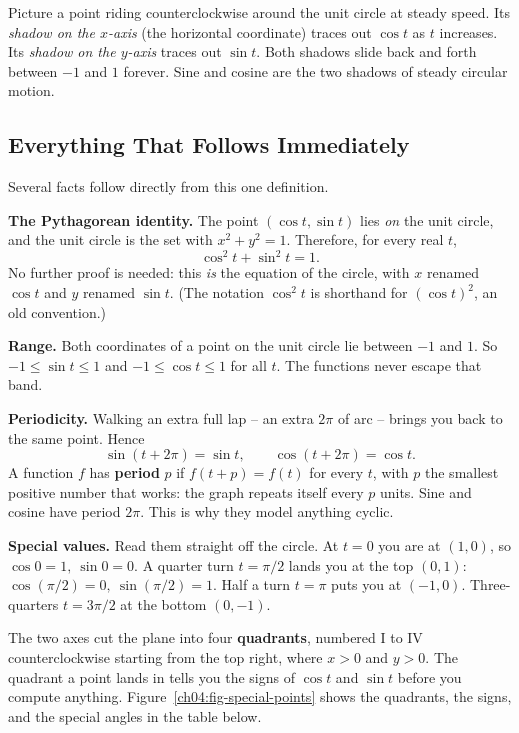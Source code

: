 \begin{intuitionbox}
Picture a point riding counterclockwise around the unit circle at steady speed. Its \emph{shadow on the $x$-axis} (the horizontal coordinate) traces out $\cos t$ as $t$ increases. Its \emph{shadow on the $y$-axis} traces out $\sin t$. Both shadows slide back and forth between $-1$ and $1$ forever. Sine and cosine are the two shadows of steady circular motion.
\end{intuitionbox}

\subsection{Everything That Follows Immediately}

Several facts follow directly from this one definition.

\textbf{The Pythagorean identity.} The point $(\cos t, \sin t)$ lies \emph{on} the unit circle, and the unit circle is the set with $x^2 + y^2 = 1$. Therefore, for every real $t$,
\[
  \boxed{\;\cos^2 t + \sin^2 t = 1.\;}
\]
No further proof is needed: this \emph{is} the equation of the circle, with $x$ renamed $\cos t$ and $y$ renamed $\sin t$. (The notation $\cos^2 t$ is shorthand for $(\cos t)^2$, an old convention.)

\textbf{Range.} Both coordinates of a point on the unit circle lie between $-1$ and $1$. So $-1 \le \sin t \le 1$ and $-1 \le \cos t \le 1$ for all $t$. The functions never escape that band.

\textbf{Periodicity.} Walking an extra full lap -- an extra $2\pi$ of arc -- brings you back to the same point. Hence
\[
  \sin(t + 2\pi) = \sin t,\qquad \cos(t + 2\pi) = \cos t.
\]
A function $f$ has \textbf{period} $p$ if $f(t+p) = f(t)$ for every $t$, with $p$ the smallest positive number that works: the graph repeats itself every $p$ units. Sine and cosine have period $2\pi$. This is why they model anything cyclic.

\textbf{Special values.} Read them straight off the circle. At $t=0$ you are at $(1,0)$, so $\cos 0 = 1,\ \sin 0 = 0$. A quarter turn $t = \pi/2$ lands you at the top $(0,1)$: $\cos(\pi/2) = 0,\ \sin(\pi/2) = 1$. Half a turn $t=\pi$ puts you at $(-1,0)$. Three-quarters $t = 3\pi/2$ at the bottom $(0,-1)$.

The two axes cut the plane into four \textbf{quadrants}, numbered I to IV counterclockwise starting from the top right, where $x>0$ and $y>0$. The quadrant a point lands in tells you the signs of $\cos t$ and $\sin t$ before you compute anything. Figure~\ref{ch04:fig-special-points} shows the quadrants, the signs, and the special angles in the table below.

